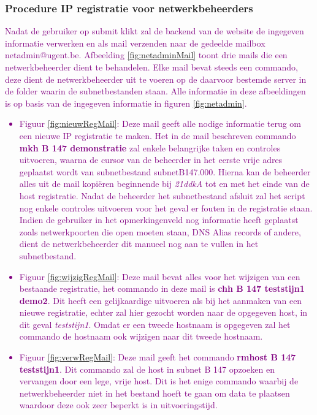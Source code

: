 \subsubsection{Procedure IP registratie voor netwerkbeheerders}
\textcolor{purple}{Nadat de gebruiker op submit klikt zal de backend van de website de ingegeven informatie verwerken en als mail verzenden naar de gedeelde mailbox netadmin@ugent.be. Afbeelding \ref{fig:netadminMail} toont drie mails die een netwerkbeheerder dient te behandelen. 
Elke mail bevat steeds een commando, deze dient de netwerkbeheerder uit te voeren op de daarvoor bestemde server in de folder waarin de subnetbestanden staan. Alle informatie in deze afbeeldingen is op basis van de ingegeven informatie in figuren \ref{fig:netadmin}.}
\textcolor{purple}{
\begin{itemize}
    \item Figuur \ref{fig:nieuwRegMail}: Deze mail geeft alle nodige informatie terug om een nieuwe IP registratie te maken. Het in de mail beschreven commando \textbf{mkh B 147 demonstratie} zal enkele belangrijke taken en controles uitvoeren, waarna de cursor van de beheerder in het eerste vrije adres geplaatst wordt van subnetbestand subnetB147.000. Hierna kan de beheerder alles uit de mail kopiëren beginnende bij \textit{21ddkA} tot en met het einde van de host registratie. Nadat de beheerder het subnetbestand afsluit zal het script nog enkele controles uitvoeren voor het geval er fouten in de registratie staan. Indien de gebruiker in het opmerkingenveld nog informatie heeft geplaatst zoals netwerkpoorten die open moeten staan, DNS Alias records of andere, dient de netwerkbeheerder dit manueel nog aan te vullen in het subnetbestand.
    \item Figuur \ref{fig:wijzigRegMail}: Deze mail bevat alles voor het wijzigen van een bestaande registratie, het commando in deze mail is \textbf{chh B 147 teststijn1 demo2}. Dit heeft een gelijkaardige uitvoeren als bij het aanmaken van een nieuwe registratie, echter zal hier gezocht worden naar de opgegeven host, in dit geval \textit{teststijn1}. Omdat er een tweede hostnaam is opgegeven zal het commando de hostnaam ook wijzigen naar dit tweede hostnaam.
    \item Figuur \ref{fig:verwRegMail}: Deze mail geeft het commando \textbf{rmhost B 147 teststijn1}. Dit commando zal de host in subnet B 147 opzoeken en vervangen door een lege, vrije host. Dit is het enige commando waarbij de netwerkbeheerder niet in het bestand hoeft te gaan om data te plaatsen waardoor deze ook zeer beperkt is in uitvoeringstijd.
\end{itemize}}

